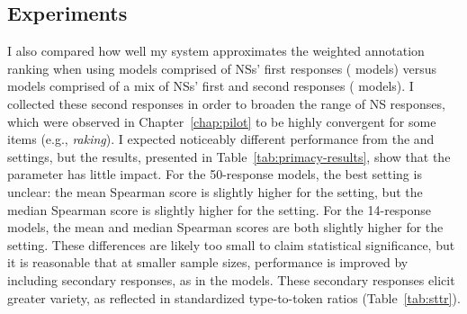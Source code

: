 %
%


\subsection{ Experiments}
\label{sec:exp-primacy}
I also compared how well my system approximates the weighted annotation ranking when using models comprised of NSs' first responses ( models) versus models comprised of a mix of NSs' first and second responses ( models). I collected these second responses in order to broaden the range of NS responses, which were observed in Chapter~\ref{chap:pilot} to be highly convergent for some items (e.g., \textit{raking}). I expected noticeably different performance from the  and  settings, but the results, presented in Table~\ref{tab:primacy-results}, show that the parameter has little impact. For the 50-response models, the best setting is unclear: the mean Spearman score is slightly higher for the  setting, but the median Spearman score is slightly higher for the  setting. For the 14-response models, the mean and median Spearman scores are both slightly higher for the  setting. These differences are likely too small to claim statistical significance, but it is reasonable that at smaller sample sizes, performance is improved by including secondary responses, as in the  models. These secondary responses elicit greater variety, as reflected in standardized type-to-token ratios (Table~\ref{tab:sttr}).


